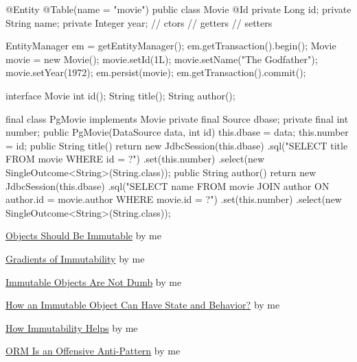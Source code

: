 \documentclass{article}
\begin{document}

\begin{pptWide}{2}
{\small\begin{ffcode}
@Entity
@Table(name = "movie")
public class Movie {
  @Id
  private Long id;
  private String name;
  private Integer year;
  // ctors
  // getters
  // setters
}
\end{ffcode}
}
\par\columnbreak\par
{\small\begin{ffcode}
EntityManager em = getEntityManager();
em.getTransaction().begin();
Movie movie = new Movie();
movie.setId(1L);
movie.setName("The Godfather");
movie.setYear(1972);
em.persist(movie);
em.getTransaction().commit();
\end{ffcode}
}
\end{pptWide}
\par
\plush{}

\begin{pptWide}{2}
{\small\begin{ffcode}
interface Movie {
  int id();
  String title();
  String author();
}
\end{ffcode}
}
\par\columnbreak\par
{\scriptsize\begin{ffcode}
final class PgMovie implements Movie
  private final Source dbase;
  private final int number;
  public PgMovie(DataSource data, int id)
    this.dbase = data;
    this.number = id;
  public String title()
    return new JdbcSession(this.dbase)
      .sql("SELECT title FROM movie WHERE id = ?")
      .set(this.number)
      .select(new SingleOutcome<String>(String.class));
  public String author()
    return new JdbcSession(this.dbase)
      .sql("SELECT name FROM movie JOIN author ON author.id = movie.author WHERE movie.id = ?")
      .set(this.number)
      .select(new SingleOutcome<String>(String.class));
\end{ffcode}
}
\end{pptWide}
\par
\plush{}


\href{https://www.yegor256.com/2014/06/09/objects-should-be-immutable.html}{Objects Should Be Immutable} by me

\href{https://www.yegor256.com/2016/09/07/gradients-of-immutability.html}{Gradients of Immutability} by me

\href{https://www.yegor256.com/2014/12/22/immutable-objects-not-dumb.html}{Immutable Objects Are Not Dumb} by me

\href{https://www.yegor256.com/2014/12/09/immutable-object-state-and-behavior.html}{How an Immutable Object Can Have State and Behavior?} by me

\href{https://www.yegor256.com/2014/11/07/how-immutability-helps.html}{How Immutability Helps} by me

\href{https://www.yegor256.com/2014/12/01/orm-offensive-anti-pattern.html}{ORM Is an Offensive Anti-Pattern} by me
\end{document}
